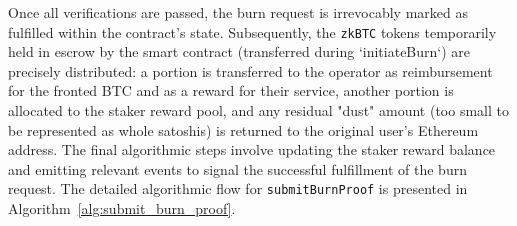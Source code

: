 \documentclass{DESSThesis}
\newcommand{\zktoken}{\texttt{zkBTC}}
\begin{document}
Once all verifications are passed, the burn request is irrevocably marked as fulfilled within the contract's state. Subsequently, the \texttt{\zktoken} tokens temporarily held in escrow by the smart contract (transferred during `initiateBurn`) are precisely distributed: a portion is transferred to the operator as reimbursement for the fronted BTC and as a reward for their service, another portion is allocated to the staker reward pool, and any residual "dust" amount (too small to be represented as whole satoshis) is returned to the original user's Ethereum address. The final algorithmic steps involve updating the staker reward balance and emitting relevant events to signal the successful fulfillment of the burn request. The detailed algorithmic flow for \texttt{submitBurnProof} is presented in Algorithm~\ref{alg:submit_burn_proof}.
\end{document}
